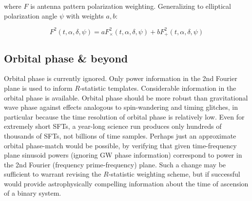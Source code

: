 \noindent where $F$ is antenna pattern polarization weighting.
Generalizing to elliptical polarization angle $\psi$ with weights $a,b$:

\begin{equation}
F^{2}(t,\alpha,\delta,\psi)=aF_{\times}^{2}(t,\alpha,\delta,\psi)+bF_{+}^{2}(t,\alpha,\delta,\psi)
\label{TwoSpect_elliptical_pol}
\end{equation}



\subsection{Orbital phase \& beyond}


Orbital phase is currently ignored.
Only power information in the 2nd Fourier plane is used to inform $R$-statistic templates.
Considerable information in the orbital phase is available.
Orbital phase should be more robust than gravitational wave phase against effects analogous to spin-wandering and timing glitches, in particular because the time resolution of orbital phase is relatively low.
Even for extremely short SFTs, a year-long science run produces only hundreds of thousands of SFTs, not billions of time samples.
Perhaps just an approximate orbital phase-match would be possible, by verifying that given time-frequency plane sinusoid powers (ignoring GW phase information) correspond to power in the 2nd Fourier (frequency prime-frequency) plane.
Such a change may be sufficient to warrant revising the $R$-statistic weighting scheme, but if successful would provide astrophysically compelling information about the time of ascension of a binary system.

